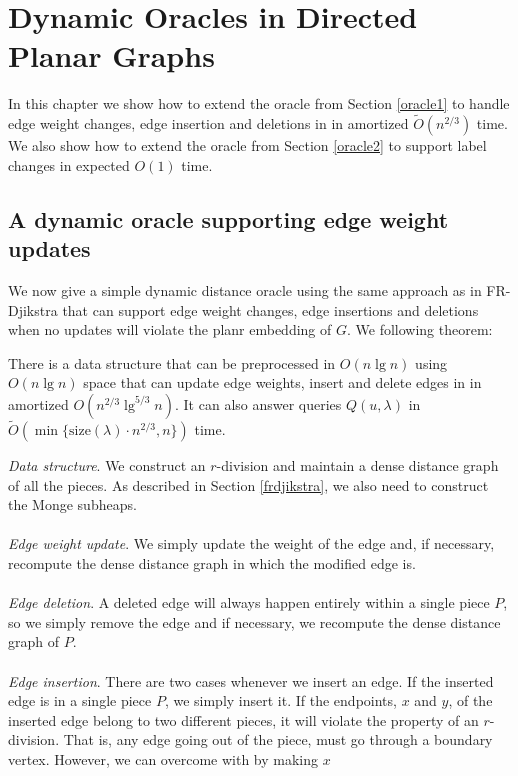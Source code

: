 \section{Dynamic Oracles in Directed Planar Graphs}\label{dynamicPlanar}
In this chapter we show how to extend the oracle from Section \ref{oracle1} to handle
edge weight changes, edge insertion and deletions in in amortized $\tilde{O}(n^{2/3})$
time. We also show how to extend the oracle from Section
\ref{oracle2} to support label changes in expected $O(1)$ time.

\subsection{A dynamic oracle supporting edge weight updates}\label{oracle3}
We now give a simple dynamic distance oracle using the same approach as in FR-Djikstra that can support edge weight changes, edge
insertions and deletions when no updates will violate the planr embedding of $G$. We following theorem:
\begin{thm}\label{thm4}
  There is a data structure that can be preprocessed in $O(n\lg n)$ using $O(n\lg n)$
  space that can update edge weights, insert and delete edges in in amortized
  $O(n^{2/3}\lg^{5/3} n)$. It can also answer queries $Q(u,\lambda)$ in
  $\tilde{O}(\min\{\text{size}(\lambda)\cdot n^{2/3}, n\})$ time.
\end{thm}
\indent \textit{Data structure}.
We construct an $r$-division and maintain a dense distance graph of all the pieces. As
described in Section \ref{frdjikstra}, we also need to construct the Monge subheaps. \\
\\
\indent \textit{Edge weight update}.
We simply update the weight of the edge and, if necessary, recompute the dense distance graph in which
the modified edge is. \\
\\
\indent \textit{Edge deletion}.
A deleted edge will always happen entirely within a single piece $P$, so we simply remove
the edge and if necessary, we recompute the dense distance graph of $P$. \\
\\
\indent \textit{Edge insertion}.
There are two cases whenever we insert an edge. If the inserted edge is in a single piece
$P$, we simply insert it. If the endpoints, $x$ and $y$, of the inserted edge belong to two different
pieces, it will violate the property of an $r$-division. That is, any edge going out of
the piece, must go through a boundary vertex. However, we can overcome with by making $x$
